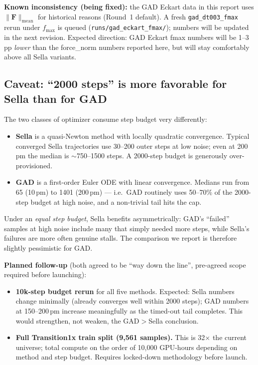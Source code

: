 \documentclass[11pt]{article}
\begin{document}
\textbf{Known inconsistency (being fixed):} the GAD Eckart data in this
report uses $\|\mathbf{F}\|_{\text{mean}}$ for historical reasons
(Round~1 default). A fresh \texttt{gad\_dt003\_fmax} rerun under
$f_{\max}$ is queued (\texttt{runs/gad\_eckart\_fmax/}); numbers will be
updated in the next revision. Expected direction: GAD Eckart fmax
numbers will be 1--3\,pp \emph{lower} than the force\_norm numbers
reported here, but will stay comfortably above all Sella variants.

\subsection*{Caveat: ``2000 steps'' is more favorable for Sella than for GAD}

The two classes of optimizer consume step budget very differently:

\begin{itemize}[nosep,leftmargin=1.5em]
\item \textbf{Sella} is a quasi-Newton method with locally quadratic
      convergence. Typical converged Sella trajectories use 30--200 outer
      steps at low noise; even at 200\,pm the median is $\sim$750--1500
      steps. A 2000-step budget is generously over-provisioned.
\item \textbf{GAD} is a first-order Euler ODE with linear convergence.
      Medians run from 65 (10\,pm) to 1401 (200\,pm) --- i.e.\ GAD
      routinely uses 50--70\% of the 2000-step budget at high noise,
      and a non-trivial tail hits the cap.
\end{itemize}

Under an \emph{equal step budget}, Sella benefits asymmetrically: GAD's
``failed'' samples at high noise include many that simply needed more
steps, while Sella's failures are more often genuine stalls. The
comparison we report is therefore slightly pessimistic for GAD.

\textbf{Planned follow-up} (both agreed to be ``way down the line'',
pre-agreed scope required before launching):
\begin{itemize}[nosep,leftmargin=1.5em]
\item \textbf{10k-step budget rerun} for all five methods. Expected:
      Sella numbers change minimally (already converges well within 2000
      steps); GAD numbers at 150--200\,pm increase meaningfully as the
      timed-out tail completes. This would strengthen, not weaken, the
      GAD$>$Sella conclusion.
\item \textbf{Full Transition1x train split (9{,}561 samples).} This is
      32$\times$ the current universe; total compute on the order of
      10{,}000 GPU-hours depending on method and step budget. Requires
      locked-down methodology before launch.
\end{itemize}
\end{document}
